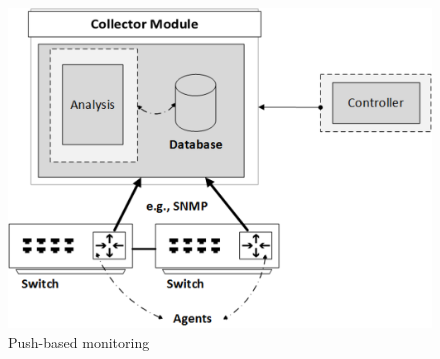 \begin{figure}[!ht]
        \centering
        \includegraphics[scale=0.49]{figures/Push-Based}
        \caption{Push-based monitoring}
        \label{fig:push-based}
\end{figure}

